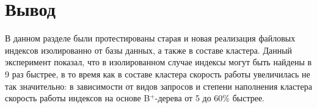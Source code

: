 \clearpage


\section*{Вывод}

В данном разделе были протестированы старая и новая реализация файловых индексов изолированно от базы данных, а также в составе кластера. Данный эксперимент показал, что в изолированном случае индексы могут быть найдены в 9 раз быстрее, в то время как в составе кластера скорость работы увеличилась не так значительно: в зависимости от видов запросов и степени наполнения кластера скорость работы индексов на основе B$^+$-дерева от 5 до 60\% быстрее.
